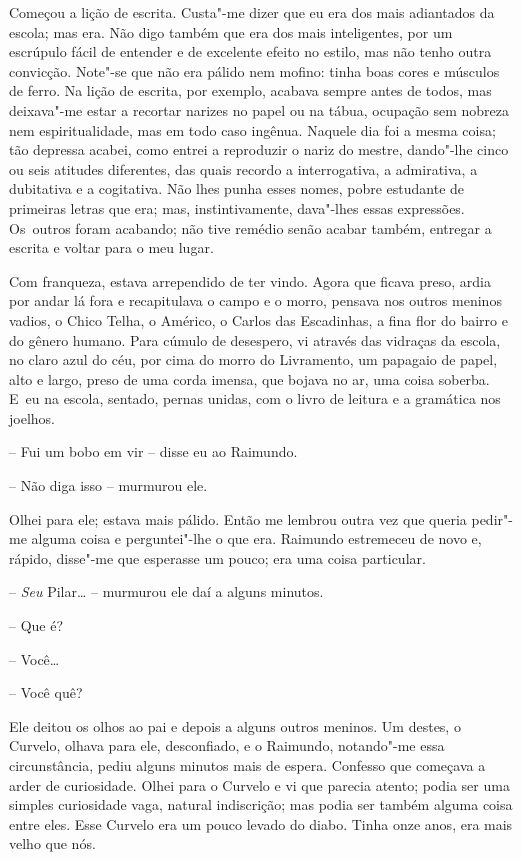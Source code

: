 Começou a lição de escrita. Custa"-me dizer que eu era dos mais
adiantados da escola; mas era. Não digo também que era dos mais
inteligentes, por um escrúpulo fácil de entender e de excelente efeito
no estilo, mas não tenho outra convicção. Note"-se que não era pálido nem
mofino: tinha boas cores e músculos de ferro. Na lição de escrita, por
exemplo, acabava sempre antes de todos, mas deixava"-me estar a recortar
narizes no papel ou na tábua, ocupação sem nobreza nem espiritualidade,
mas em todo caso ingênua. Naquele dia foi a mesma coisa; tão depressa
acabei, como entrei a reproduzir o nariz do mestre, dando"-lhe cinco ou
seis atitudes diferentes, das quais recordo a interrogativa, a
admirativa, a dubitativa e a cogitativa. Não lhes punha esses nomes,
pobre estudante de primeiras letras que era; mas, instintivamente,
dava"-lhes essas expressões. Os~outros foram acabando; não tive remédio
senão acabar também, entregar a escrita e voltar para o meu lugar.

Com franqueza, estava arrependido de ter vindo. Agora que ficava preso,
ardia por andar lá fora e recapitulava o campo e o morro, pensava nos
outros meninos vadios, o Chico Telha, o Américo, o Carlos das
Escadinhas, a fina flor do bairro e do gênero humano. Para cúmulo de
desespero, vi através das vidraças da escola, no claro azul do céu, por
cima do morro do Livramento, um papagaio de papel, alto e largo, preso
de uma corda imensa, que bojava no ar, uma coisa soberba. E~eu na
escola, sentado, pernas unidas, com o livro de leitura e a gramática nos
joelhos.

-- Fui um bobo em vir -- disse eu ao Raimundo.

-- Não diga isso -- murmurou ele.

Olhei para ele; estava mais pálido. Então me lembrou outra vez que
queria pedir"-me alguma coisa e perguntei"-lhe o que era. Raimundo
estremeceu de novo e, rápido, disse"-me que esperasse um pouco; era uma
coisa particular.

-- \emph{Seu} Pilar\ldots{} -- murmurou ele daí a alguns minutos.

-- Que é?

-- Você\ldots{}

-- Você quê?

Ele deitou os olhos ao pai e depois a alguns outros meninos. Um destes,
o Curvelo, olhava para ele, desconfiado, e o Raimundo, notando"-me essa
circunstância, pediu alguns minutos mais de espera. Confesso que
começava a arder de curiosidade. Olhei para o Curvelo e vi que parecia
atento; podia ser uma simples curiosidade vaga, natural indiscrição; mas
podia ser também alguma coisa entre eles. Esse Curvelo era um pouco
levado do diabo. Tinha onze anos, era mais velho que nós.

